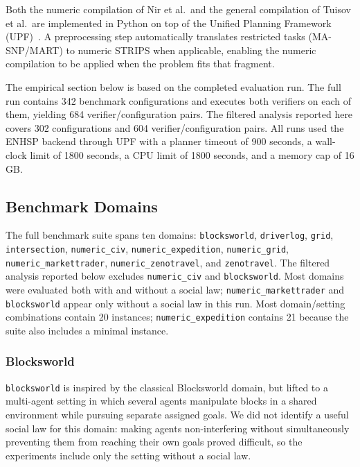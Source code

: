 \documentclass{article}
\theoremstyle{definition}
\begin{document}
Both the numeric compilation of Nir et al.\ and the general compilation of Tuisov et al.\ are implemented in Python on top of the Unified Planning Framework (UPF)~\cite{upf2025}. A preprocessing step automatically translates restricted tasks (MA-SNP/MART) to numeric STRIPS when applicable, enabling the numeric compilation to be applied when the problem fits that fragment.

The empirical section below is based on the completed evaluation run.
The full run contains 342 benchmark configurations and executes both verifiers on each of them, yielding 684 verifier/configuration pairs. The filtered analysis reported here covers 302 configurations and 604 verifier/configuration pairs. All runs used the ENHSP backend through UPF with a planner timeout of 900 seconds, a wall-clock limit of 1800 seconds, a CPU limit of 1800 seconds, and a memory cap of 16 GB.

\subsection{Benchmark Domains}


The full benchmark suite spans ten domains:
\texttt{blocksworld},
\texttt{driverlog},
\texttt{grid},
\texttt{intersection},
\texttt{numeric\_civ},
\texttt{numeric\_expedition},
\texttt{numeric\_grid},
\texttt{numeric\_markettrader},
\texttt{numeric\_zenotravel}, and
\texttt{zenotravel}.
The filtered analysis reported below excludes \texttt{numeric\_civ} and \texttt{blocksworld}. Most domains were evaluated both with and without a social law; \texttt{numeric\_markettrader} and \texttt{blocksworld} appear only without a social law in this run. Most domain/setting combinations contain 20 instances; \texttt{numeric\_expedition} contains 21 because the suite also includes a minimal instance.

\subsubsection{Blocksworld}

\texttt{blocksworld} is inspired by the classical Blocksworld domain, but lifted to a multi-agent setting in which several agents manipulate blocks in a shared environment while pursuing separate assigned goals. We did not identify a useful social law for this domain: making agents non-interfering without simultaneously preventing them from reaching their own goals proved difficult, so the experiments include only the setting without a social law.
\end{document}
